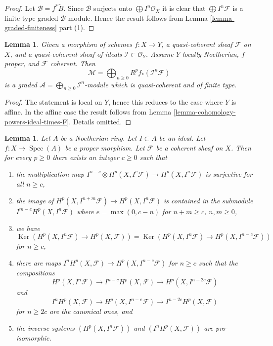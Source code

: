 \documentclass{stacks-project}
\theoremstyle{plain}
\newtheorem{lemma}[subsection]{Lemma}
\theoremstyle{definition}
\theoremstyle{remark}
\numberwithin{equation}{subsection}
\def\Spec{\mathop{\mathrm{Spec}}}
\def\Ker{\mathop{\mathrm{Ker}}}
\begin{document}
\begin{proof}
Let $\mathcal{B} = f^*\widetilde{B}$. Since $\mathcal{B}$ surjects
onto $\bigoplus I^n\mathcal{O}_X$ it is clear that
$\bigoplus I^n\mathcal{F}$ is a finite type graded $\mathcal{B}$-module.
Hence the result follows from Lemma \ref{lemma-graded-finiteness} part (1).
\end{proof}

\begin{lemma}
\label{lemma-cohomology-powers-ideal-times-sheaf}
Given a morphism of schemes $f : X \to Y$, a quasi-coherent sheaf
$\mathcal{F}$ on $X$, and a quasi-coherent sheaf of ideals
$\mathcal{I} \subset \mathcal{O}_Y$. Assume $Y$ locally
Noetherian, $f$ proper, and $\mathcal{F}$ coherent.
Then
$$
\mathcal{M} =
\bigoplus\nolimits_{n \geq 0} R^pf_*(\mathcal{I}^n\mathcal{F})
$$
is a graded $\mathcal{A} = \bigoplus_{n \geq 0} \mathcal{I}^n$-module
which is quasi-coherent and of finite type.
\end{lemma}

\begin{proof}
The statement is local on $Y$, hence this reduces to the
case where $Y$ is affine. In the affine case the result follows
from Lemma \ref{lemma-cohomology-powers-ideal-times-F}.
Details omitted.
\end{proof}

\begin{lemma}
\label{lemma-cohomology-powers-ideal-application}
Let $A$ be a Noetherian ring.
Let $I \subset A$ be an ideal.
Let $f : X \to \Spec(A)$ be a proper morphism.
Let $\mathcal{F}$ be a coherent sheaf on $X$.
Then for every $p \geq 0$ there exists an integer $c \geq 0$
such that
\begin{enumerate}
\item the multiplication map
$I^{n - c} \otimes H^p(X, I^c\mathcal{F}) \to H^p(X, I^n\mathcal{F})$
is surjective for all $n \geq c$,
\item the image of $H^p(X, I^{n + m}\mathcal{F}) \to H^p(X, I^n\mathcal{F})$
is contained in the submodule $I^{m - e} H^p(X, I^n\mathcal{F})$
where $e = \max(0, c - n)$ for $n + m \geq c$, $n, m \geq 0$,
\item we have
$$
\Ker(H^p(X, I^n\mathcal{F}) \to H^p(X, \mathcal{F})) =
\Ker(H^p(X, I^n\mathcal{F}) \to H^p(X, I^{n - c}\mathcal{F}))
$$
for $n \geq c$,
\item there are maps $I^nH^p(X, \mathcal{F}) \to H^p(X, I^{n - c}\mathcal{F})$
for $n \geq c$ such that the compositions
$$
H^p(X, I^n\mathcal{F}) \to 
I^{n - c}H^p(X, \mathcal{F}) \to
H^p(X, I^{n - 2c}\mathcal{F})
$$
and
$$
I^nH^p(X, \mathcal{F}) \to
H^p(X, I^{n - c}\mathcal{F}) \to
I^{n - 2c}H^p(X, \mathcal{F})
$$
for $n \geq 2c$ are the canonical ones, and
\item the inverse systems $(H^p(X, I^n\mathcal{F}))$ and
$(I^nH^p(X, \mathcal{F}))$ are pro-isomorphic.
\end{enumerate}
\end{lemma}
\end{document}
